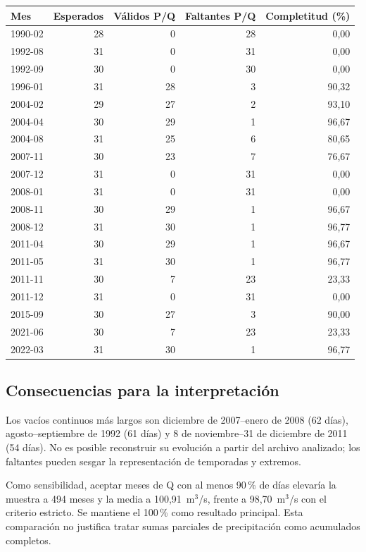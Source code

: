 \begin{center}
\small
\begin{tabular}{lrrrr}
\hline
Mes & Esperados & Válidos P/Q & Faltantes P/Q & Completitud (\%) \\
\hline
1990-02 & 28 & 0 & 28 & 0,00 \\
1992-08 & 31 & 0 & 31 & 0,00 \\
1992-09 & 30 & 0 & 30 & 0,00 \\
1996-01 & 31 & 28 & 3 & 90,32 \\
2004-02 & 29 & 27 & 2 & 93,10 \\
2004-04 & 30 & 29 & 1 & 96,67 \\
2004-08 & 31 & 25 & 6 & 80,65 \\
2007-11 & 30 & 23 & 7 & 76,67 \\
2007-12 & 31 & 0 & 31 & 0,00 \\
2008-01 & 31 & 0 & 31 & 0,00 \\
2008-11 & 30 & 29 & 1 & 96,67 \\
2008-12 & 31 & 30 & 1 & 96,77 \\
2011-04 & 30 & 29 & 1 & 96,67 \\
2011-05 & 31 & 30 & 1 & 96,77 \\
2011-11 & 30 & 7 & 23 & 23,33 \\
2011-12 & 31 & 0 & 31 & 0,00 \\
2015-09 & 30 & 27 & 3 & 90,00 \\
2021-06 & 30 & 7 & 23 & 23,33 \\
2022-03 & 31 & 30 & 1 & 96,77 \\
\hline
\end{tabular}
\end{center}

\subsection{Consecuencias para la interpretación}
Los vacíos continuos más largos son diciembre de 2007--enero de 2008 (62 días),
agosto--septiembre de 1992 (61 días) y 8 de noviembre--31 de diciembre de 2011
(54 días). No es posible reconstruir su evolución a partir del archivo analizado;
los faltantes pueden sesgar la representación de temporadas y extremos.

Como sensibilidad, aceptar meses de Q con al menos 90\,\% de días elevaría la
muestra a 494 meses y la media a 100,91~m$^3$/s, frente a 98,70~m$^3$/s con el
criterio estricto. Se mantiene el 100\,\% como resultado principal. Esta comparación
no justifica tratar sumas parciales de precipitación como acumulados completos.

